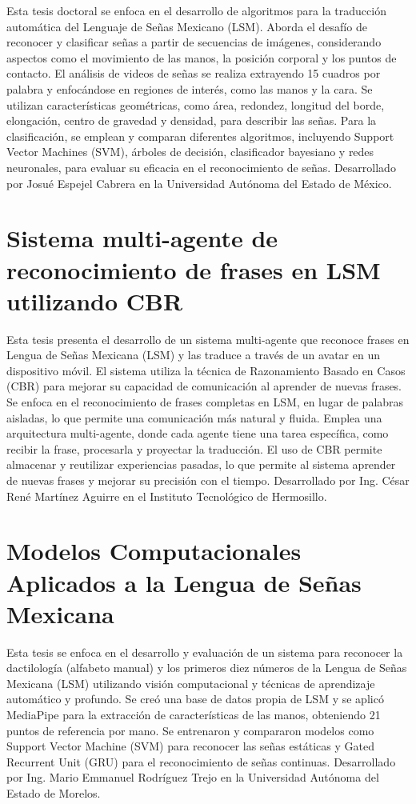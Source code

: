 Esta tesis doctoral se enfoca en el desarrollo de algoritmos para la traducción automática del Lenguaje de Señas Mexicano (LSM). Aborda el desafío de reconocer y clasificar señas a partir de secuencias de imágenes, considerando aspectos como el movimiento de las manos, la posición corporal y los puntos de contacto.  El análisis de videos de señas se realiza extrayendo 15 cuadros por palabra y enfocándose en regiones de interés, como las manos y la cara.  Se utilizan características geométricas, como área, redondez, longitud del borde, elongación, centro de gravedad y densidad, para describir las señas. Para la clasificación, se emplean y comparan diferentes algoritmos, incluyendo Support Vector Machines (SVM), árboles de decisión, clasificador bayesiano y redes neuronales, para evaluar su eficacia en el reconocimiento de señas. Desarrollado por Josué Espejel Cabrera en la Universidad Autónoma del Estado de México.


\section{Sistema multi-agente de reconocimiento de frases en LSM utilizando CBR \cite{ref31}}

Esta tesis presenta el desarrollo de un sistema multi-agente que reconoce frases en Lengua de Señas Mexicana (LSM) y las traduce a través de un avatar en un dispositivo móvil. El sistema utiliza la técnica de Razonamiento Basado en Casos (CBR) para mejorar su capacidad de comunicación al aprender de nuevas frases. Se enfoca en el reconocimiento de frases completas en LSM, en lugar de palabras aisladas, lo que permite una comunicación más natural y fluida.  Emplea una arquitectura multi-agente, donde cada agente tiene una tarea específica, como recibir la frase, procesarla y proyectar la traducción.  El uso de CBR permite almacenar y reutilizar experiencias pasadas, lo que permite al sistema aprender de nuevas frases y mejorar su precisión con el tiempo. Desarrollado por Ing. César René Martínez Aguirre en el Instituto Tecnológico de Hermosillo.


\section{Modelos Computacionales Aplicados a la Lengua de Señas Mexicana \cite{ref32}}

Esta tesis se enfoca en el desarrollo y evaluación de un sistema para reconocer la dactilología (alfabeto manual) y los primeros diez números de la Lengua de Señas Mexicana (LSM) utilizando visión computacional y técnicas de aprendizaje automático y profundo. Se creó una base de datos propia de LSM y se aplicó MediaPipe para la extracción de características de las manos, obteniendo 21 puntos de referencia por mano. Se entrenaron y compararon modelos como Support Vector Machine (SVM) para reconocer las señas estáticas y Gated Recurrent Unit (GRU) para el reconocimiento de señas continuas. Desarrollado por Ing. Mario Emmanuel Rodríguez Trejo en la Universidad Autónoma del Estado de Morelos.

